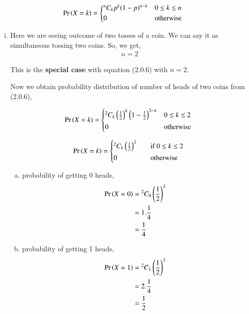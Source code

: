 \documentclass[journal,12pt,twocolumn]{IEEEtran}
\begin{document}
\begin{align}
   \pr{X=k} =
  \begin{cases*}
    {^n C_k}p^{k}(1-p)^{n-k} & $0 \leq k \leq n$\\
      0 & otherwise
  \end{cases*}
\end{align}

\begin{enumerate}[(i)]

\item
Here we are seeing outcome of two tosses of a coin. We can say it as simultaneous tossing two coins. So, we get,
\begin{align}
    n=2
\end{align}

This is the \textbf{special case} with equation (2.0.6) with $n=2$.

Now we obtain probability distribution of number of heads of two coins from (2.0.6),

\begin{align*}
   \pr{X=k} =
  \begin{cases*}
    {^2 C_k}\left(\frac{1}{2}\right)^{k}\left(1-\frac{1}{2}\right)^{2-k} & $0 \leq k \leq 2$\\
    0 & otherwise
  \end{cases*}
\end{align*}

\begin{align}
   \pr{X=k} =
  \begin{cases*}
    {^2 C_k}\left(\frac{1}{2}\right)^{2} \quad& if $0 \leq k \leq 2$ \\
    0 \quad& otherwise
  \end{cases*}
\end{align}


\begin{enumerate}[(a)]
    \item probability of getting 0 heads,
        \begin{align}
            \begin{split}
                \Pr\left(X=0\right) &= {^2C_0}\left(\frac{1}{2}\right)^2\\
                &=1.\frac{1}{4}\\
                &=\frac{1}{4}
            \end{split}
        \end{align}

    \item probability of getting 1 heads,
        \begin{align}
            \begin{split}
                \Pr\left(X=1\right) &= {^2C_1}\left(\frac{1}{2}\right)^2\\
                &=2.\frac{1}{4}\\
                &=\frac{1}{2}
            \end{split}
        \end{align}


\end{enumerate}
\end{enumerate}
\end{document}

